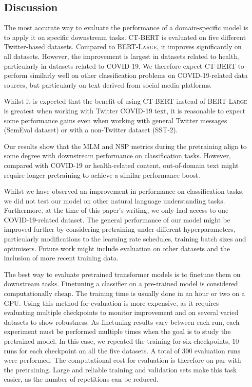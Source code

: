 \documentclass{article}
\begin{document}
\begin{multicols}{2}

\section{Discussion}
\label{sec:discussion}
The most accurate way to evaluate the performance of a domain-specific model is to apply it on specific downstream tasks.
\textsc{CT-BERT} is evaluated on five different Twitter-based datasets.
Compared to \textsc{BERT-Large}, it improves significantly on all datasets.
However, the improvement is largest in datasets related to health, particularly in datasets related to COVID-19.
We therefore expect \textsc{CT-BERT} to perform similarly well on other classification problems on COVID-19-related data sources, but particularly on text derived from social media platforms.

Whilst it is expected that the benefit of using \textsc{CT-BERT} instead of \textsc{BERT-Large} is greatest when working with Twitter COVID-19 text, it is reasonable to expect some performance gains even when working with general Twitter messages (SemEval dataset) or with a non-Twitter dataset (SST-2).

Our results show that the MLM and NSP metrics during the pretraining align to some degree with downstream performance on classification tasks.
However, compared with COVID-19 or health-related content, out-of-domain text might require longer pretraining to achieve a similar performance boost.

Whilst we have observed an improvement in performance on classification tasks, we did not test our model on other natural language understanding tasks.
Furthermore, at the time of this paper’s writing, we only had access to one COVID-19-related dataset.
The general performance of our model might be improved further by considering pretraining under different hyperparameters, particularly modifications to the learning rate schedules, training batch sizes and optimisers.
Future work might include evaluation on other datasets and the inclusion of more recent training data.

The best way to evaluate pretrained transformer models is to finetune them on downstream tasks.
Finetuning a classifier on a pre-trained model is considered computationally cheap.
The training time is usually done in an hour or two on a GPU.
Using this method for evaluation is more expensive, as it requires evaluating multiple checkpoints to monitor improvement and on several varied datasets to show robustness.
As finetuning results vary between each run, each experiment must be performed multiple times when the goal is to study the pretrained model.
In this case, we repeated the training for six checkpoints, 10 runs for each checkpoint on all the five datasets.
A total of 300 evaluation runs were performed.
The computational cost for evaluation is therefore on par with the pretraining.
Large and reliable training and validation sets make this task easier, as the number of repetitions can be reduced.


\end{multicols}
\end{document}
